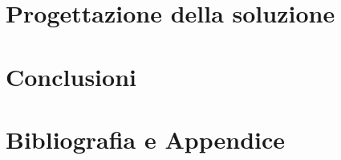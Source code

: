 	\cleardoublepage\part{Progettazione della soluzione}
	
	
	
	
	\cleardoublepage\part{Conclusioni}
	
	
	
	
	\cleardoublepage\part{Bibliografia e Appendice}
	\cleardoublepage
	\appendix
	
	


